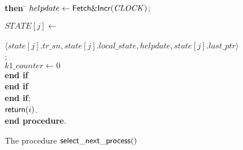 \begin{figure}[htb]
{{\begin{minipage}[t]{150mm}
\begin{tabbing}
 \>\>\>\>\>\> \> \> {\bf then} \=
        $helpdate \leftarrow {\sf Fetch\&Incr}(\mathit{CLOCK})$; \\

 \>\>\>\>\>\> \>\> \>

$\mathit{STATE}[j]\leftarrow$\\

 \>\>\>\>\>\> \>\> \> ~~~~
    $\langle state[j].tr\_sn, state[j].local\_state, helpdate, 
                                          state[j].last\_ptr \rangle$ \\

 \>\>\>\>\>\> ; \\

 \>\>\>\>\>\> $k1\_counter \leftarrow 0$\\


 \>\>\>\>\>  {\bf end if}\\

 \>\>\> {\bf end if}\\

  \>   {\bf end if};\\ 

 \>   ${\sf return}(i)$. \\ 

{\bf end procedure}.

\end{tabbing}
\normalsize
\end{minipage}
}
\caption{The procedure ${\sf select\_next\_process}()$}
\label{fig:select-next-proc}
}
\end{figure}

